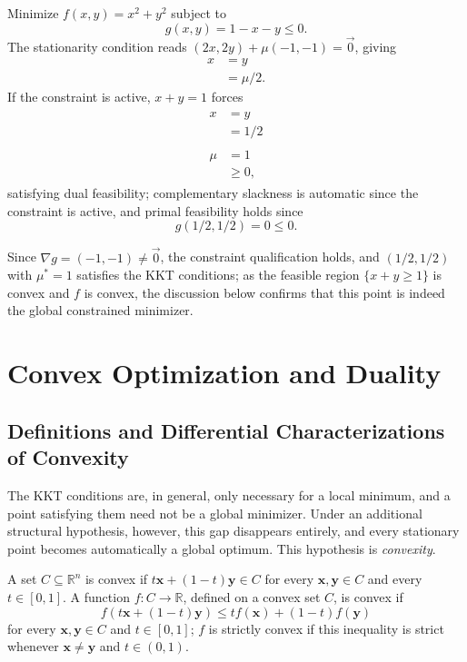 \begin{example}
Minimize $f(x,y) = x^2+y^2$ subject to
\[
g(x,y) = 1 - x - y \leq 0.
\]
The stationarity condition reads $(2x,2y) + \mu(-1,-1) = \vec{0}$, giving
\[
\begin{aligned}
x &= y \\
&= \mu/2.
\end{aligned}
\]
If the constraint is active, $x+y=1$ forces
\[
\begin{gathered}
\begin{aligned}
x &= y \\
&= 1/2
\end{aligned} \\
\begin{aligned}
\mu &= 1 \\
&\geq 0,
\end{aligned}
\end{gathered}
\]
satisfying dual feasibility; complementary slackness is automatic since the constraint is active, and primal feasibility holds since
\[
g(1/2,1/2)=0 \leq 0.
\]

Since $\nabla g = (-1,-1) \neq \vec{0}$, the constraint qualification holds, and $(1/2,1/2)$ with $\mu^*=1$ satisfies the KKT conditions; as the feasible region $\{x+y\geq 1\}$ is convex and $f$ is convex, the discussion below confirms that this point is indeed the global constrained minimizer.
\end{example}



\section{Convex Optimization and Duality}

\subsection{Definitions and Differential Characterizations of Convexity}


The KKT conditions are, in general, only necessary for a local minimum, and a point satisfying them need not be a global minimizer. Under an
additional structural hypothesis, however, this gap disappears entirely, and every stationary point becomes automatically a global optimum. This
hypothesis is \textit{convexity}.

\begin{definition}
A set $C \subseteq \mathbb{R}^n$ is convex if $t\mathbf{x} + (1-t)\mathbf{y} \in C$ for every $\mathbf{x}, \mathbf{y} \in C$ and every $t \in [0,1]$. A function $f : C \to \mathbb{R}$, defined on a convex set $C$, is convex if
\[
f(t\mathbf{x}+(1-t)\mathbf{y}) \leq t f(\mathbf{x}) + (1-t) f(\mathbf{y})
\]
 for every $\mathbf{x}, \mathbf{y} \in C$ and $t \in [0,1]$; $f$ is strictly convex if this inequality is strict whenever $\mathbf{x} \neq \mathbf{y}$ and $t \in (0,1)$.
\end{definition}

